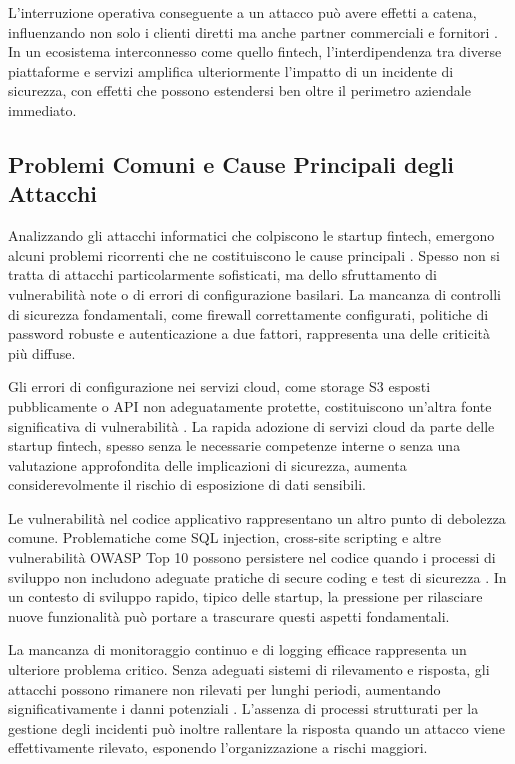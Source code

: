 \documentclass[a4paper,12pt]{report}
\begin{document}
L’interruzione operativa conseguente a un attacco può avere effetti a catena, influenzando non solo i clienti diretti ma anche partner commerciali e fornitori \cite{fintechChallenges}. In un ecosistema interconnesso come quello fintech, l’interdipendenza tra diverse piattaforme e servizi amplifica ulteriormente l’impatto di un incidente di sicurezza, con effetti che possono estendersi ben oltre il perimetro aziendale immediato.

\subsection*{Problemi Comuni e Cause Principali degli Attacchi}

Analizzando gli attacchi informatici che colpiscono le startup fintech, emergono alcuni problemi ricorrenti che ne costituiscono le cause principali \cite{fintechChallenges}. Spesso non si tratta di attacchi particolarmente sofisticati, ma dello sfruttamento di vulnerabilità note o di errori di configurazione basilari. La mancanza di controlli di sicurezza fondamentali, come firewall correttamente configurati, politiche di password robuste e autenticazione a due fattori, rappresenta una delle criticità più diffuse.

Gli errori di configurazione nei servizi cloud, come storage S3 esposti pubblicamente o API non adeguatamente protette, costituiscono un’altra fonte significativa di vulnerabilità \cite{fintechChallenges}. La rapida adozione di servizi cloud da parte delle startup fintech, spesso senza le necessarie competenze interne o senza una valutazione approfondita delle implicazioni di sicurezza, aumenta considerevolmente il rischio di esposizione di dati sensibili.

Le vulnerabilità nel codice applicativo rappresentano un altro punto di debolezza comune. Problematiche come SQL injection, cross-site scripting e altre vulnerabilità OWASP Top 10 possono persistere nel codice quando i processi di sviluppo non includono adeguate pratiche di secure coding e test di sicurezza \cite{fintechChallenges}. In un contesto di sviluppo rapido, tipico delle startup, la pressione per rilasciare nuove funzionalità può portare a trascurare questi aspetti fondamentali.

La mancanza di monitoraggio continuo e di logging efficace rappresenta un ulteriore problema critico. Senza adeguati sistemi di rilevamento e risposta, gli attacchi possono rimanere non rilevati per lunghi periodi, aumentando significativamente i danni potenziali \cite{fintechChallenges}. L’assenza di processi strutturati per la gestione degli incidenti può inoltre rallentare la risposta quando un attacco viene effettivamente rilevato, esponendo l’organizzazione a rischi maggiori.
\end{document}
